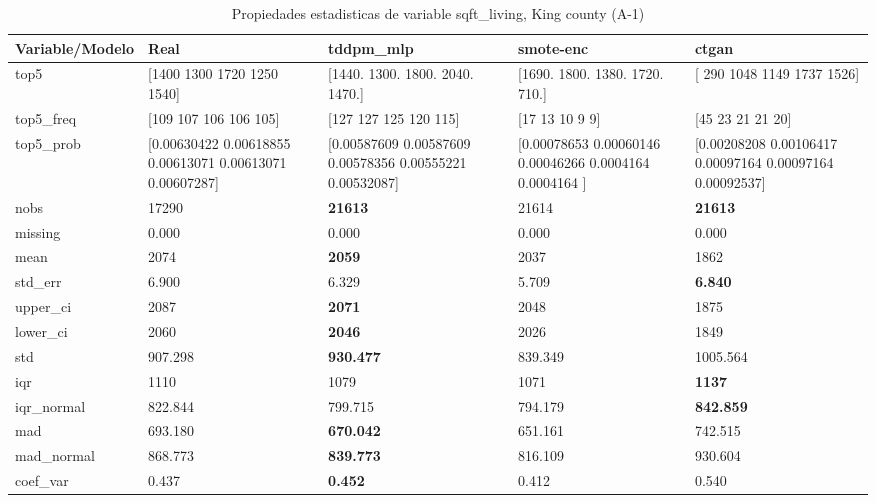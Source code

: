 \begin{table}[H]
\centering
\fontsize{8}{14}\selectfont
\caption{Propiedades  estadisticas de variable sqft\_living, King county (A-1)}
\label{table-stats-king county-a-1-sqft_living}
\begin{tabular}{|l|m{10em}|m{10em}|m{10em}|m{10em}|}
\hline
 \rowcolor[gray]{0.8}
Variable/Modelo & Real & tddpm\_mlp & smote-enc & ctgan \\
\hline top5 & [1400 1300 1720 1250 1540] & [1440. 1300. 1800. 2040. 1470.] & [1690. 1800. 1380. 1720.  710.] & [ 290 1048 1149 1737 1526] \\
\hline top5\_freq & [109 107 106 106 105] & [127 127 125 120 115] & [17 13 10  9  9] & [45 23 21 21 20] \\
\hline top5\_prob & [0.00630422 0.00618855 0.00613071 0.00613071 0.00607287] & [0.00587609 0.00587609 0.00578356 0.00555221 0.00532087] & [0.00078653 0.00060146 0.00046266 0.0004164  0.0004164 ] & [0.00208208 0.00106417 0.00097164 0.00097164 0.00092537] \\
\hline nobs & 17290 & \bfseries 21613 & \cellcolor[rgb]{0.9, 0.54, 0.52} 21614 & \bfseries 21613 \\
\hline missing & 0.000 & 0.000 & 0.000 & 0.000 \\
\hline mean & 2074 & \bfseries 2059 & 2037 & \cellcolor[rgb]{0.9, 0.54, 0.52} 1862 \\
\hline std\_err & 6.900 & 6.329 & \cellcolor[rgb]{0.9, 0.54, 0.52} 5.709 & \bfseries 6.840 \\
\hline upper\_ci & 2087 & \bfseries 2071 & 2048 & \cellcolor[rgb]{0.9, 0.54, 0.52} 1875 \\
\hline lower\_ci & 2060 & \bfseries 2046 & 2026 & \cellcolor[rgb]{0.9, 0.54, 0.52} 1849 \\
\hline std & 907.298 & \bfseries 930.477 & 839.349 & \cellcolor[rgb]{0.9, 0.54, 0.52} 1005.564 \\
\hline iqr & 1110 & 1079 & \cellcolor[rgb]{0.9, 0.54, 0.52} 1071 & \bfseries 1137 \\
\hline iqr\_normal & 822.844 & 799.715 & \cellcolor[rgb]{0.9, 0.54, 0.52} 794.179 & \bfseries 842.859 \\
\hline mad & 693.180 & \bfseries 670.042 & 651.161 & \cellcolor[rgb]{0.9, 0.54, 0.52} 742.515 \\
\hline mad\_normal & 868.773 & \bfseries 839.773 & 816.109 & \cellcolor[rgb]{0.9, 0.54, 0.52} 930.604 \\
\hline coef\_var & 0.437 & \bfseries 0.452 & 0.412 & \cellcolor[rgb]{0.9, 0.54, 0.52} 0.540 \\

\end{tabular}
\end{table}
